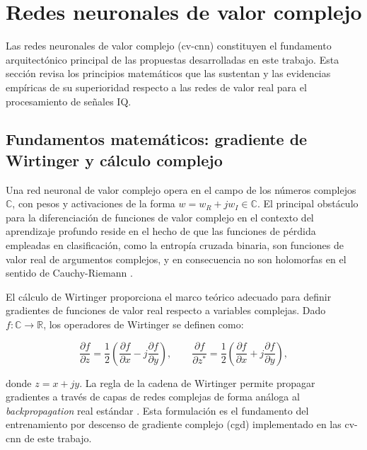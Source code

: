 \section{Redes neuronales de valor complejo}
\label{sec:cv_cnn}

Las redes neuronales de valor complejo (\gls{cv-cnn}) constituyen el fundamento
arquitectónico principal de las propuestas desarrolladas en este trabajo. Esta
sección revisa los principios matemáticos que las sustentan y las evidencias empíricas
de su superioridad respecto a las redes de valor real para el procesamiento de
señales IQ.

\subsection{Fundamentos matemáticos: gradiente de Wirtinger y cálculo complejo}
\label{subsec:wirtinger}

Una red neuronal de valor complejo opera en el campo de los números complejos
$\mathbb{C}$, con pesos y activaciones de la forma $w = w_R + jw_I \in \mathbb{C}$.
El principal obstáculo para la diferenciación de funciones de valor complejo en el
contexto del aprendizaje profundo reside en el hecho de que las funciones de pérdida
empleadas en clasificación, como la entropía cruzada binaria, son funciones de valor
real de argumentos complejos, y en consecuencia no son holomorfas en el sentido
de Cauchy-Riemann \cite{khan_historic_2025}.

El cálculo de Wirtinger proporciona el marco teórico adecuado para definir
gradientes de funciones de valor real respecto a variables complejas. Dado
$f: \mathbb{C} \to \mathbb{R}$, los operadores de Wirtinger se definen como:

\begin{equation}
 \frac{\partial f}{\partial z} = \frac{1}{2}\left(\frac{\partial f}{\partial x} - j\frac{\partial f}{\partial y}\right), \qquad
 \frac{\partial f}{\partial z^*} = \frac{1}{2}\left(\frac{\partial f}{\partial x} + j\frac{\partial f}{\partial y}\right),
\end{equation}

donde $z = x + jy$. La regla de la cadena de Wirtinger permite propagar gradientes
a través de capas de redes complejas de forma análoga al \textit{backpropagation}
real estándar \cite{hirose_complex-valued_2012, hirose_complex_2012}. Esta
formulación es el fundamento del entrenamiento por descenso de gradiente complejo
(\gls{cgd}) implementado en las \gls{cv-cnn} de este trabajo.

